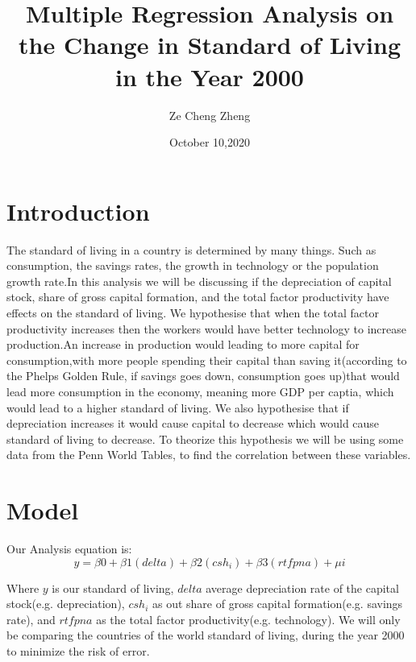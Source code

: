 \documentclass{article}
\title{\textbf{Multiple Regression Analysis on the Change in Standard of Living in the Year 2000}}
\author{Ze Cheng Zheng}
\date{October 10,2020}
\begin{document}
\maketitle

\section{Introduction}
The standard of living in a country is determined by many things. Such as consumption, the savings rates, the growth in technology or the population growth rate.In this analysis we will be discussing if the depreciation of capital stock, share of gross capital formation, and the total factor productivity have effects on the standard of living. We hypothesise that when the total factor productivity increases then the workers would have better technology to increase production.An increase in production would leading to more capital for consumption,with more people spending their capital than saving it(according to the Phelps Golden Rule, if savings goes down, consumption goes up)that would lead more consumption in the economy, meaning more GDP per captia, which would lead to a higher standard of living. We also hypothesise that if depreciation increases it would cause capital to decrease which would cause standard of living to decrease. To theorize this hypothesis we will be using some data from the Penn World Tables, to find the correlation between these variables. 

\section{Model}
Our Analysis equation is:
\begin{equation}
    y= \beta 0+\beta 1 (delta) + \beta 2 (csh_i) + \beta 3  (rtfpna) + \mu i
\end{equation}

Where $y$ is our standard of living, $delta$ average depreciation rate of the capital stock(e.g. depreciation), $csh_i$ as out share of gross capital formation(e.g. savings rate), and $rtfpna$ as the total factor productivity(e.g. technology). We will only be comparing the countries of the world standard of living, during the year 2000 to minimize the risk of error.
\end{document}
